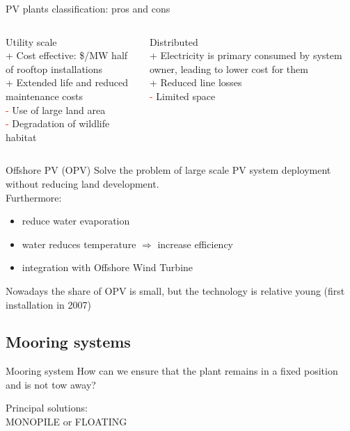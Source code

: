 \documentclass[aspectratio=169, 12pt]{beamer}
\begin{document}
\begin{frame}{PV plants classification: pros and cons}
  \begin{columns}
    \begin{column}{0.5\columnwidth}
      {\center \textcolor{NTNUBlue}{Utility scale}}\\
      \textcolor{NTNUgreen}{+} Cost effective: \$/MW half of rooftop installations\\
      \textcolor{NTNUgreen}{+} Extended life and reduced maintenance costs\\
      \textcolor{red}{-} Use of large land area\\
      \textcolor{red}{-} Degradation of wildlife habitat
    \end{column}
    \begin{column}{0.5\columnwidth}
      {\center \textcolor{NTNUBlue}{Distributed}}\\
      \textcolor{NTNUgreen}{+} Electricity is primary consumed by system owner, leading to lower cost for them\\
      \textcolor{NTNUgreen}{+} Reduced line losses\\
      \textcolor{red}{-} Limited space
    \end{column}
  \end{columns}
\end{frame}

\begin{frame}{Offshore PV (OPV)}
  Solve the problem of large scale PV system deployment without reducing land development. \\
  Furthermore: 
  \begin{itemize}
    \item reduce water evaporation
    \item water reduces temperature $\Rightarrow$ increase efficiency
    \item integration with Offshore Wind Turbine
  \end{itemize} 

  Nowadays the share of OPV is small, but the technology is relative young (first installation in 2007)
\end{frame}

\subsection{Mooring systems}
\begin{frame}{Mooring system}
  How can we ensure that the plant remains in a fixed position and is not tow away?

  Principal solutions:\\
  \textcolor{NTNUBlue}{MONOPILE} or \textcolor{NTNUBlue}{FLOATING}
  
\end{frame}
\end{document}
